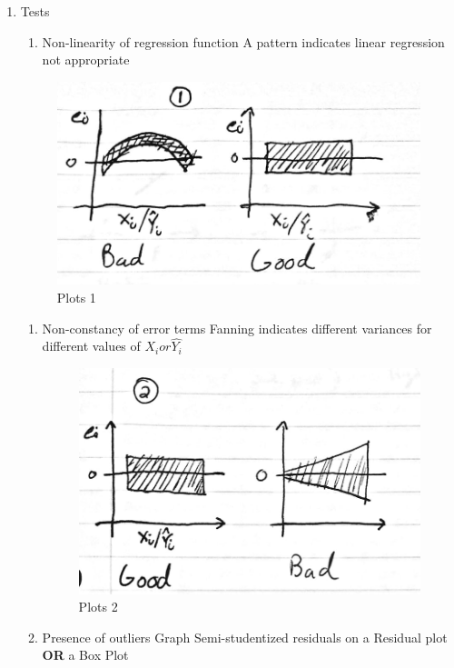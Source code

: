 \documentclass[11pt]{article}
\begin{document}
\begin{enumerate}
\item Tests
\label{sec:orgd7e1fdf}
\begin{enumerate}
\item Non-linearity of regression function
A pattern indicates linear regression not appropriate
\end{enumerate}

\begin{figure}[htbp]
\centering
\includegraphics[width=.9\linewidth]{./images/resplot_1-1.jpg}
\caption{\label{fig:org4843ac6}Plots 1}
\end{figure}
\begin{enumerate}
\item Non-constancy of error terms
Fanning indicates different variances for different values of \(X_i or \hat{Y_i}\)

\begin{figure}[htbp]
\centering
\includegraphics[width=.9\linewidth]{./images/resplot_2-1.jpg}
\caption{\label{fig:orgb511b12}Plots 2}
\end{figure}
\item Presence of outliers
Graph Semi-studentized residuals on a Residual plot \textbf{OR} a Box Plot


\end{enumerate}
\end{enumerate}
\end{document}
